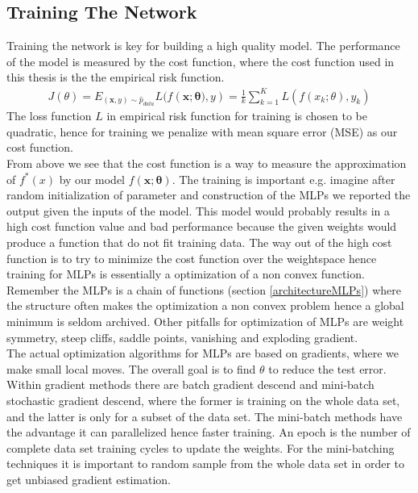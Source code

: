 \subsection{Training The Network}\label{trainNetwork}
Training the network is key for building a high quality model. The performance of the model is measured by the cost function, where the cost function used in this thesis is the the empirical risk function.
\begin{align*}
J(\theta)=E_{(\bm{x},y)\sim \hat{p}_{data}} L(f(\bm{x};\bm{\theta)},y)= \frac{1}{k}\sum_{k=1}^{K} L(f(x_k;\theta),y_k)
\end{align*}
The loss function $L$ in empirical risk function for training is chosen to be quadratic, hence for training we penalize with mean square error (MSE) as our cost function.\\

From above we see that the cost function is a way to measure the approximation of $f^*(x)$ by our model $f(\bm{x};\bm{\theta})$. The training is important e.g. imagine after random initialization of parameter and construction of the MLPs we reported the output given the inputs of the model. This model would probably results in a high cost function value and bad performance because the given weights would produce a function that do not fit training data. The way out of the high cost function is to try to minimize the cost function over the weightspace hence training for MLPs is essentially a optimization of a non convex function. Remember the MLPs is a chain of functions (section \ref{architectureMLPs}) where the structure often makes the optimization a non convex problem hence a global minimum is seldom archived. Other pitfalls for optimization of MLPs are weight symmetry, steep cliffs, saddle points, vanishing and exploding gradient.\\

The actual optimization algorithms for MLPs are based on gradients, where we make small local moves. The overall goal is to find $\theta$ to reduce the test error. Within gradient methods there are batch gradient descend and mini-batch stochastic gradient descend, where the former is training on the whole data set, and the latter is only for a subset of the data set. The mini-batch methods have the advantage it can parallelized hence faster training. An epoch is the number of complete data set training cycles to update the weights. For the mini-batching techniques it is important to random sample from the whole data set in order to get unbiased gradient estimation. \\

